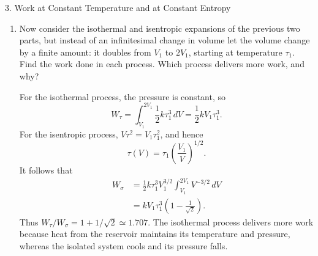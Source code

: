 \documentclass[11pt]{article}
\begin{document}
\begin{problem}{3. Work at Constant Temperature and at Constant Entropy}
\begin{enumerate}[label=(\alph*)]
\begin{answer}
The ratio tends to one as \(\Delta V\to0\), because both processes start at the same pressure. The isentropic process cools as it expands, but the resulting difference in work enters at second order in \(\Delta V\).
\end{answer}
\item Now consider the isothermal and isentropic expansions of the previous two parts, but instead of an infinitesimal change in volume let the volume change by a finite amount: it doubles from \(V_1\) to \(2V_1\), starting at temperature \(\tau_1\).
  Find the work done in each process.
  Which process delivers more work, and why?
\begin{answer}
For the isothermal process, the pressure is constant, so
\begin{equation}
\label{eq:p3-finite-isothermal}
\boxed{W_\tau=\int_{V_1}^{2V_1}\frac12k\tau_1^3\,dV
=\frac12kV_1\tau_1^3}.
\end{equation}
For the isentropic process, \(V\tau^2=V_1\tau_1^2\), and hence
\begin{equation}
\label{eq:p3-adiabatic-temperature}
\tau(V)=\tau_1\left(\frac{V_1}{V}\right)^{1/2}.
\end{equation}
It follows that
\begin{equation}
\label{eq:p3-finite-isentropic}
\begin{aligned}
W_\sigma
&=\frac12k\tau_1^3V_1^{3/2}\int_{V_1}^{2V_1}V^{-3/2}\,dV\\
&=\boxed{kV_1\tau_1^3\left(1-\frac{1}{\sqrt2}\right)}.
\end{aligned}
\end{equation}
Thus \(W_\tau/W_\sigma=1+1/\sqrt2\simeq1.707\). The isothermal process delivers more work because heat from the reservoir maintains its temperature and pressure, whereas the isolated system cools and its pressure falls.
\end{answer}
\end{enumerate}
\end{problem}
\end{document}
